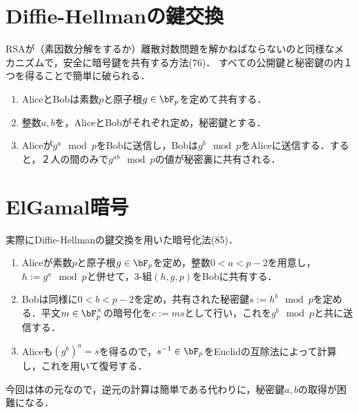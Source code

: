\documentclass[uplatex,dvipdfmx]{jsreport}
\begin{document}
\section{Diffie-Hellmanの鍵交換}

\begin{tcolorbox}[colframe=ForestGreen, colback=ForestGreen!10!white,breakable,colbacktitle=ForestGreen!40!white,coltitle=black,fonttitle=\bfseries\sffamily,
title=]
    RSAが（素因数分解をするか）離散対数問題を解かねばならないのと同様なメカニズムで，安全に暗号鍵を共有する方法(76)．
    すべての公開鍵と秘密鍵の内１つを得ることで簡単に破られる．
\end{tcolorbox}

\begin{definition}\mbox{}
    \begin{enumerate}
        \item AliceとBobは素数$p$と原子根$g\in\bF_p$を定めて共有する．
        \item 整数$a,b$を，AliceとBobがそれぞれ定め，秘密鍵とする．
        \item Aliceが$g^a\mod p$をBobに送信し，Bobは$g^b\mod p$をAliceに送信する．すると，２人の間のみで$g^{ab}\mod p$の値が秘密裏に共有される．
    \end{enumerate}
\end{definition}

\section{ElGamal暗号}

\begin{tcolorbox}[colframe=ForestGreen, colback=ForestGreen!10!white,breakable,colbacktitle=ForestGreen!40!white,coltitle=black,fonttitle=\bfseries\sffamily,
title=]
    実際にDiffie-Hellmanの鍵交換を用いた暗号化法(85)．
\end{tcolorbox}

\begin{definition}\mbox{}
    \begin{enumerate}
        \item Aliceが素数$p$と原子根$g\in\bF_p$を定め，整数$0<a<p-2$を用意し，$h:=g^a\mod p$と併せて，3-組$(h,g,p)$をBobに共有する．
        \item Bobは同様に$0<b<p-2$を定め，共有された秘密鍵$s:=h^b\mod p$を定める．平文$m\in\bF^\times_p$の暗号化を$c:=ms$として行い，これを$g^b\mod p$と共に送信する．
        \item Aliceも$(g^b)^a=s$を得るので，$s^{-1}\in\bF_p$をEuclidの互除法によって計算し，これを用いて復号する．
    \end{enumerate}
\end{definition}
\begin{remarks}
    今回は体の元なので，逆元の計算は簡単である代わりに，秘密鍵$a,b$の取得が困難になる．
\end{remarks}
\end{document}
